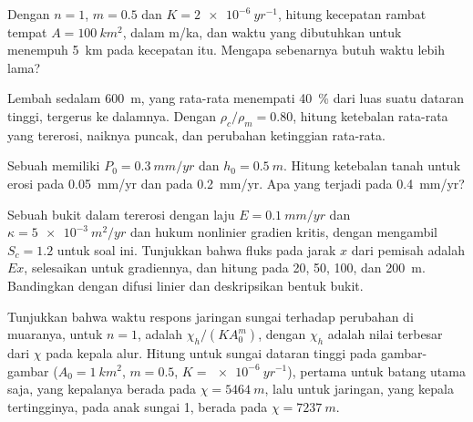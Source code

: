 \begin{exercise}[$\star\star$]\label{exo:b3:quantitative-geomorphology:7}
Dengan $n = 1$, $m = 0.5$ dan $K = \qty{2e-6}{yr^{-1}}$, hitung
kecepatan rambat  tempat $A = \qty{100}{km^2}$, dalam m/ka, dan
waktu yang dibutuhkan untuk menempuh \qty{5}{km} pada kecepatan itu. Mengapa
sebenarnya butuh waktu lebih lama?
\end{exercise}

\begin{exercise}[$\star\star$]\label{exo:b3:quantitative-geomorphology:8}
Lembah sedalam \qty{600}{m}, yang rata-rata menempati \qty{40}{\percent} dari
luas suatu dataran tinggi, tergerus ke dalamnya. Dengan $\rho_c/\rho_m = 0.80$, hitung
ketebalan rata-rata yang tererosi, naiknya puncak, dan perubahan
ketinggian rata-rata.
\end{exercise}

\begin{exercise}[$\star\star$]\label{exo:b3:quantitative-geomorphology:9}
Sebuah  memiliki $P_0 = \qty{0.3}{mm/yr}$ dan $h_0 =
\qty{0.5}{m}$. Hitung ketebalan tanah  untuk erosi pada
\qty{0.05}{mm/yr} dan pada \qty{0.2}{mm/yr}. Apa yang terjadi pada
\qty{0.4}{mm/yr}?
\end{exercise}

\begin{exercise}[$\star\star\star$]\label{exo:b3:quantitative-geomorphology:10}
Sebuah bukit dalam  tererosi dengan laju $E = \qty{0.1}{mm/yr}$ dan $\kappa =
\qty{5e-3}{m^2/yr}$ dan hukum nonlinier gradien kritis, dengan mengambil
$S_c = 1.2$ untuk soal ini. Tunjukkan bahwa fluks pada jarak $x$ dari
pemisah adalah $E x$, selesaikan untuk gradiennya, dan hitung pada 20, 50, 100, dan
\qty{200}{m}. Bandingkan dengan difusi linier dan deskripsikan bentuk
bukit.
\end{exercise}

\begin{exercise}[$\star\star\star$]\label{exo:b3:quantitative-geomorphology:11}
Tunjukkan bahwa waktu respons jaringan sungai terhadap perubahan di muaranya,
untuk $n = 1$, adalah $\chi_h/(K A_0^m)$, dengan $\chi_h$ adalah nilai terbesar dari
$\chi$ pada kepala alur. Hitung untuk sungai dataran tinggi pada gambar-gambar
($A_0 = \qty{1}{km^2}$, $m = 0.5$, $K = \qty{e-6}{yr^{-1}}$), pertama untuk
batang utama saja, yang kepalanya berada pada $\chi = \qty{5464}{m}$, lalu untuk jaringan,
yang kepala tertingginya, pada anak sungai 1, berada pada $\chi = \qty{7237}{m}$.
\end{exercise}

